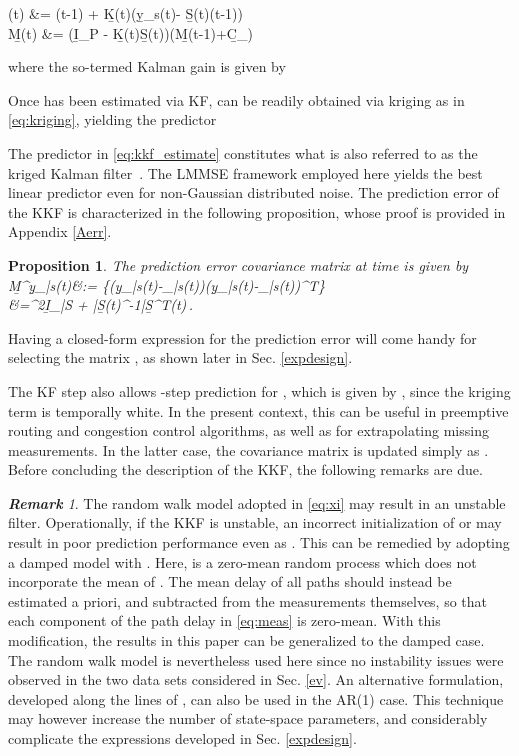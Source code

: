 \documentclass[draftcls,onecolumn,12pt]{IEEEtran}
\def \yst {{\b{y}_s(t)}}
\def \ybt {{\b{y}_{\bar{s}}(t)}}
\def \yh {{\hat{\b{y}}_{\bar{s}}}}
\def \chih {{\hat{\bs{\chi}}}}
\def \Exp {\mathbb{E}}
\def \My {{\b{M}^{\b{y}}_{\bar{s}}(t)}}
\def \Kt {{\b{K}(t)}}
\def \ceta {{\b{C}_{\bs{\eta}}}}
\def \cnu {{\b{C}_{\bs{\nu}}}}
\def \St {{\b{S}(t)}}
\def \Stt {{\b{S}^T(t)}}
\def \Sb {{\bar{\b{S}}(t)}}
\def \Sbt {{\bar{\b{S}}^T(t)}}
\theoremstyle{plain}\newtheorem{thm}{Theorem}
\newtheorem{prop}{Proposition}
\theoremstyle{definition}
\theoremstyle{remark}
\newtheorem{rem}{\bf Remark}
\begin{document}
\chih(t) &= \chih(t-1) + \Kt(\yst - \St\chih(t-1))\label{iterx}\\
\b{M}(t) &= (\b{I}_P - \Kt\St)(\b{M}(t-1)+\ceta)\label{iterM}

where the so-termed Kalman gain  is given by

Once  has been estimated via KF,  can be readily obtained via kriging as in \eqref{eq:kriging}, yielding the predictor
 {

}
The predictor in \eqref{eq:kkf_estimate} constitutes what is also referred to as the kriged Kalman filter~\cite{MGRA98,WiC99}. 
The LMMSE framework employed here yields the best linear predictor even for non-Gaussian distributed noise. The prediction error of the KKF is characterized in the following proposition, whose proof is provided in Appendix \ref{Aerr}.
\begin{prop}
The prediction error covariance matrix at time  is given by
\label{errormat}
\My  &:= \Exp\{(\ybt-\yh(t))(\ybt-\yh(t))^T\} \\
&=\sigma^2\b{I}_{\bar{S}} + \Sb\left[(\b{M}(t-1) + \cnu + \ceta)^{-1} + \frac{1}{\sigma^2}\Stt\St\right]^{-1}\Sbt\,.

\end{prop}
Having a closed-form expression for the prediction error will come handy for selecting the matrix , as shown later in Sec. \ref{expdesign}.

The KF step also allows -step prediction for , which is given by , since the kriging term is temporally white. 
In the present context, this can be useful in preemptive routing and congestion control algorithms, as well as for extrapolating missing measurements. 
In the latter case, the covariance matrix is updated simply as .
Before concluding the description of the KKF, the following remarks are due.
\begin{rem}
The random walk model adopted in \eqref{eq:xi} may result in an unstable filter. Operationally, if the KKF is unstable, an incorrect initialization of  or  may result in poor prediction performance even as .
This can be remedied by adopting a damped model  with . { Here,  is a zero-mean random process which does not incorporate the mean of . The mean delay of all paths should instead be estimated a priori, and subtracted from the measurements themselves, so that each component of the path delay in \eqref{eq:meas} is zero-mean.}
With this modification, the results in this paper can be generalized to the damped case. 
The random walk model is nevertheless used here since no instability issues were observed in the two data sets considered in Sec. \ref{ev}.
{ An alternative formulation, developed along the lines of \cite{casas}, can also be used in the AR(1) case. This technique may however increase the number of state-space parameters, and considerably complicate the expressions developed in Sec. \ref{expdesign}.}
\end{rem}
\end{document}
